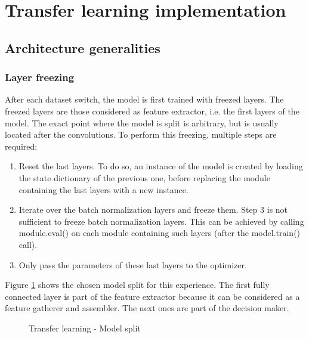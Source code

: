 \section{Transfer learning implementation}
\subsection{Architecture generalities}
\subsubsection{Layer freezing}
\setlength{\marginparwidth}{3cm}\leavevmode {}After each dataset switch, the model is first trained with freezed layers. The freezed layers are those considered as feature extractor, i.e. the first layers of the model. The exact point where the model is split is arbitrary, but is usually located after the convolutions. To perform this freezing, multiple steps are required:
\begin{enumerate}
	\item Reset the last layers. To do so, an instance of the model is created by loading the state dictionary of the previous one, before replacing the module containing the last layers with a new instance. 
	\item Iterate over the batch normalization layers and freeze them. Step 3 is not sufficient to freeze batch normalization layers. This can be achieved by calling module.eval() on each module containing such layers (after the model.train() call). 
	\item Only pass the parameters of these last layers to the optimizer.
\end{enumerate}

\noindent Figure \ref{fig:tl_model_split} shows the chosen model split for this experience. The first fully connected layer is part of the feature extractor because it can be considered as a feature gatherer and assembler. The next ones are part of the decision maker. 

\begin{figure}[!h]
\centering
\noindent
{}
\caption{Transfer learning - Model split}
\label{fig:tl_model_split}
\end{figure}


